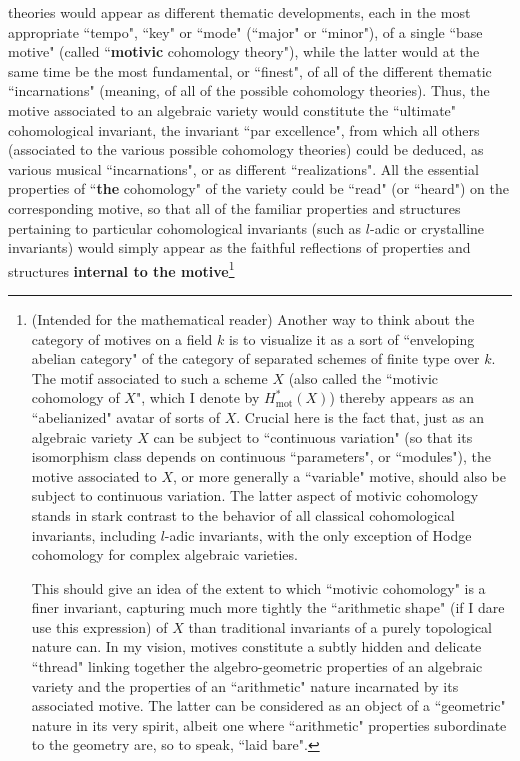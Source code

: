theories would appear as different thematic developments, each in the most appropriate ``tempo", ``key" or ``mode" (``major" or ``minor"), of a single ``base motive" (called ``\textbf{motivic} cohomology theory"), while the latter would at the same time be the most fundamental, or ``finest", of all of the different thematic ``incarnations" (meaning, of all of the possible cohomology theories). Thus, the motive associated to an algebraic variety would constitute the ``ultimate" cohomological invariant, the invariant ``par excellence", from which all others (associated to the various possible cohomology theories) could be deduced, as various musical ``incarnations", or as different ``realizations". All the essential properties of ``\textbf{the} cohomology" of the variety could be ``read" (or ``heard") on the corresponding motive, so that all of the familiar properties and structures pertaining to particular cohomological invariants (such as $l$-adic or crystalline invariants) would simply appear as the faithful reflections of properties and structures \textbf{internal to the motive}\footnote{(Intended for the mathematical reader) Another way to think about the category of motives on a field $k$ is to visualize it as a sort of ``enveloping abelian category" of the category of separated schemes of finite type over $k$. The motif associated to such a scheme $X$ (also called the ``motivic cohomology of $X$", which I denote by $H^*_{\text{mot}}(X)$) thereby appears as an ``abelianized" avatar of sorts of $X$. Crucial here is the fact that, just as an algebraic variety $X$ can be subject to ``continuous variation" (so that its isomorphism class depends on continuous ``parameters", or ``modules"), the motive associated to $X$, or more generally a ``variable" motive, should also be subject to continuous variation. The latter aspect of motivic cohomology stands in stark contrast to the behavior of all classical cohomological invariants, including $l$-adic invariants, with the only exception of Hodge cohomology for complex algebraic varieties.

This should give an idea of the extent to which ``motivic cohomology" is a finer invariant, capturing much more tightly the ``arithmetic shape" (if I dare use this expression) of $X$ than traditional invariants of a purely topological nature can. In my vision, motives constitute a subtly hidden and delicate ``thread" linking together the algebro-geometric properties of an algebraic variety and the properties of an ``arithmetic" nature incarnated by its associated motive. The latter can be considered as an object of a ``geometric" nature in its very spirit, albeit one where ``arithmetic" properties subordinate to the geometry are, so to speak, ``laid bare". 

}
